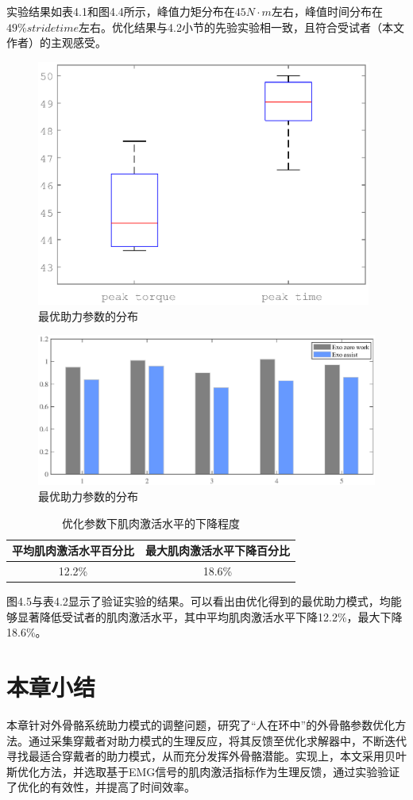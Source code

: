 实验结果如表4.1和图4.4所示，峰值力矩分布在$45N\cdot m$左右，峰值时间分布在$49\% stride time$左右。优化结果与4.2小节的先验实验相一致，且符合受试者（本文作者）的主观感受。
\begin{figure}[htb]
    \includegraphics[width=11cm]{fig/f64.eps}
    \caption{最优助力参数的分布}
    \label{fig:mark}
\end{figure}
\begin{figure}[!htb]
    \includegraphics[width=17cm]{fig/f65.eps}
    \caption{最优助力参数的分布}
    \label{fig:mark}
\end{figure}
\begin{table}[!htb]
    \caption[控制参数]{优化参数下肌肉激活水平的下降程度}
    \begin{tabular}{cc}
      \toprule
      平均肌肉激活水平百分比 & 最大肌肉激活水平下降百分比 \\
      \midrule
        12.2\% & 18.6\% \\
      \bottomrule
    \end{tabular}
\end{table}

图4.5与表4.2显示了验证实验的结果。可以看出由优化得到的最优助力模式，均能够显著降低受试者的肌肉激活水平，其中平均肌肉激活水平下降12.2\%，最大下降18.6\%。

\section{本章小结}

本章针对外骨骼系统助力模式的调整问题，研究了“人在环中”的外骨骼参数优化方法。通过采集穿戴者对助力模式的生理反应，将其反馈至优化求解器中，不断迭代寻找最适合穿戴者的助力模式，从而充分发挥外骨骼潜能。实现上，本文采用贝叶斯优化方法，并选取基于EMG信号的肌肉激活指标作为生理反馈，通过实验验证了优化的有效性，并提高了时间效率。